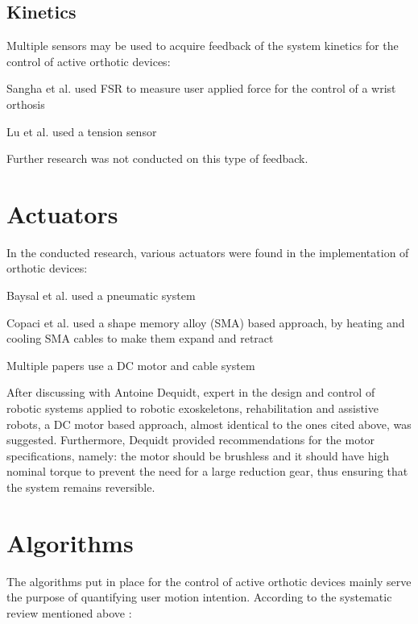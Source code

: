 \subsection{Kinetics}
Multiple sensors may be used to acquire feedback of the system kinetics for the 
control of active orthotic devices: 

\begin{IEEEitemize}
  \item Sangha et al. \cite{sangha_compact_2016} used FSR to measure user applied 
    force for the control of a wrist orthosis  
  \item Lu et al. \cite{lu_development_2019} used a tension sensor 
\end{IEEEitemize}

Further research was not conducted on this type of feedback.  

\section{Actuators}
In the conducted research, various actuators were found in the implementation 
of orthotic devices: 

\begin{IEEEitemize}
  \item Baysal et al. \cite{baysal_implementation_2023} used a pneumatic system
  \item Copaci et al. \cite{copaci_sma_2019} used a shape memory alloy (SMA) based 
    approach, by heating and cooling SMA cables to make them expand and retract
  \item Multiple papers \cite{lu_development_2019, wu_neural-network-enhanced_2019, 
    wu_adaptive_2023} use a DC motor and cable system
\end{IEEEitemize}

After discussing with Antoine Dequidt, expert in the design and control of 
robotic systems applied to robotic exoskeletons, rehabilitation and assistive 
robots, a DC motor based approach, almost identical to the ones cited above, 
was suggested. Furthermore, Dequidt provided recommendations for the motor 
specifications, namely: the motor should be brushless and it should have high 
nominal torque to prevent the need for a large reduction gear, thus ensuring 
that the system remains reversible.  

\FloatBarrier
\section{Algorithms}
The algorithms put in place for the control of active orthotic devices mainly 
serve the purpose of quantifying user motion intention. According to the 
systematic review mentioned above \cite{dos_santos_signals_2023}: 

